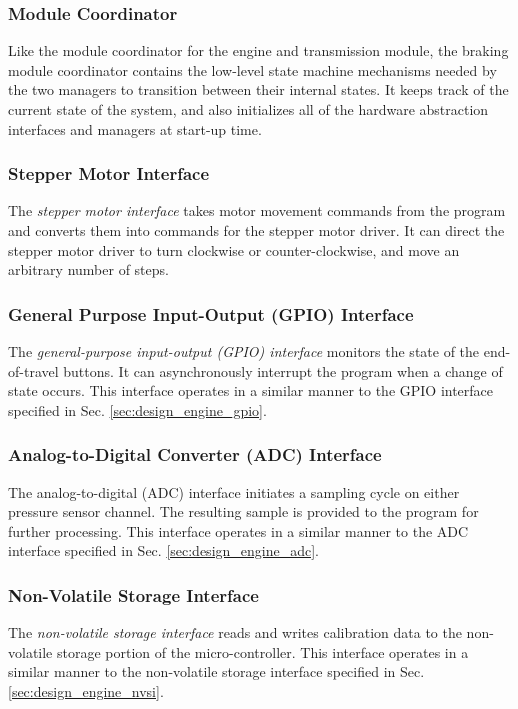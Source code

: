 \subsubsection{Module Coordinator}

Like the module coordinator for the engine and transmission module, the braking module coordinator contains the low-level state machine mechanisms needed by the two managers to transition between their internal states. It keeps track of the current state of the system, and also initializes all of the hardware abstraction interfaces and managers at start-up time. 

\subsubsection{Stepper Motor Interface}

The \emph{stepper motor interface} takes motor movement commands from the program and converts them into commands for the stepper motor driver. It can direct the stepper motor driver to turn clockwise or counter-clockwise, and move an arbitrary number of steps. 

\subsubsection{General Purpose Input-Output (GPIO) Interface}

The \emph{general-purpose input-output (GPIO) interface} monitors the state of the end-of-travel buttons. It can asynchronously interrupt the program when a change of state occurs. This interface operates in a similar manner to the GPIO interface specified in Sec. \ref{sec:design_engine_gpio}.

\subsubsection{Analog-to-Digital Converter (ADC) Interface}  

The analog-to-digital (ADC) interface initiates a sampling cycle on either pressure sensor channel. The resulting sample is provided to  the program for further processing. This interface operates in a similar manner to the ADC interface specified in Sec. \ref{sec:design_engine_adc}.

\subsubsection{Non-Volatile Storage Interface}

The \emph{non-volatile storage interface} reads and writes calibration data to the non-volatile storage portion of the micro-controller. This interface operates in a similar manner to the non-volatile storage interface specified in Sec. \ref{sec:design_engine_nvsi}.

